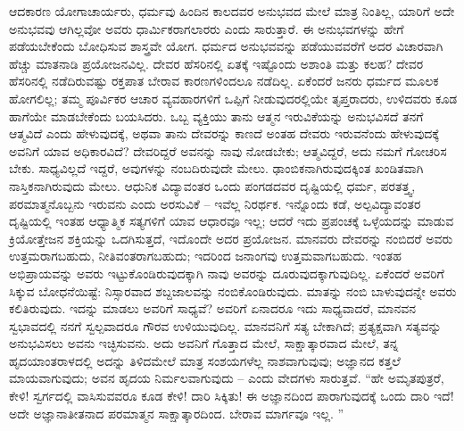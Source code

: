 ಆದಕಾರಣ ಯೋಗಾಚಾರ್ಯರು, ಧರ್ಮವು ಹಿಂದಿನ ಕಾಲದವರ ಅನುಭವದ ಮೇಲೆ ಮಾತ್ರ ನಿಂತಿಲ್ಲ, ಯಾರಿಗೆ ಅದೇ ಅನುಭವವು ಆಗಿಲ್ಲವೋ ಅವರು ಧಾರ್ಮಿಕರಾಗಲಾರರು ಎಂದು ಸಾರುತ್ತಾರೆ. ಈ ಅನುಭವಗಳನ್ನು ಹೇಗೆ ಪಡೆಯಬೇಕೆಂದು ಬೋಧಿಸುವ ಶಾಸ್ತ್ರವೇ ಯೋಗ. ಧರ್ಮದ ಅನುಭವವನ್ನು ಪಡೆಯುವವರೆಗೆ ಅದರ ವಿಚಾರವಾಗಿ ಹೆಚ್ಚು ಮಾತನಾಡಿ ಪ್ರಯೋಜನವಿಲ್ಲ. ದೇವರ ಹೆಸರಿನಲ್ಲಿ ಏತಕ್ಕೆ ಇಷ್ಟೊಂದು ಅಶಾಂತಿ ಮತ್ತು ಕಲಹ? ದೇವರ ಹೆಸರಿನಲ್ಲಿ ನಡೆದಿರುವಷ್ಟು ರಕ್ತಪಾತ ಬೇರಾವ ಕಾರಣಗಳಿಂದಲೂ ನಡೆದಿಲ್ಲ. ಏಕೆಂದರೆ ಜನರು ಧರ್ಮದ ಮೂಲಕ ಹೋಗಲಿಲ್ಲ; ತಮ್ಮ ಪೂರ್ವಿಕರ ಆಚಾರ ವ್ಯವಹಾರಗಳಿಗೆ ಒಪ್ಪಿಗೆ ನೀಡುವುದರಲ್ಲಿಯೇ ತೃಪ್ತರಾದರು, ಉಳಿದವರು ಕೂಡ ಹಾಗೆಯೇ ಮಾಡಬೇಕೆಂದು ಬಯಸಿದರು. ಒಬ್ಬ ವ್ಯಕ್ತಿಯು ತಾನು ಆತ್ಮನ ಇರುವಿಕೆಯನ್ನು ಅನುಭವಿಸದೆ ತನಗೆ ಆತ್ಮವಿದೆ ಎಂದು ಹೇಳುವುದಕ್ಕೆ, ಅಥವಾ ತಾನು ದೇವರನ್ನು ಕಾಣದೆ ಅಂತಹ ದೇವರು ಇರುವನೆಂದು ಹೇಳುವುದಕ್ಕೆ ಅವನಿಗೆ ಯಾವ ಅಧಿಕಾರವಿದೆ? ದೇವರಿದ್ದರೆ ಅವನನ್ನು ನಾವು ನೋಡಬೇಕು; ಆತ್ಮವಿದ್ದರೆ, ಅದು ನಮಗೆ ಗೋಚರಿಸ ಬೇಕು. ಸಾಧ್ಯವಿಲ್ಲದೆ ಇದ್ದರೆ, ಅವುಗಳನ್ನು ನಂಬದಿರುವುದೇ ಮೇಲು. ಢಾಂಬಿಕನಾಗಿರುವುದಕ್ಕಿಂತ ಖಂಡಿತವಾಗಿ ನಾಸ್ತಿಕನಾಗಿರುವುದು ಮೇಲು. ಆಧುನಿಕ ವಿದ್ಯಾವಂತರ ಒಂದು ಪಂಗಡದವರ ದೃಷ್ಟಿಯಲ್ಲಿ ಧರ್ಮ, ಪರತತ್ತ್ವ, ಪರಮಾತ್ಮನೊಬ್ಬನು ಇರುವನು ಎಂದು ಅರಸುವಿಕೆ – ಇವೆಲ್ಲ ನಿರರ್ಥಕ. ಇನ್ನೊಂದು ಕಡೆ, ಅಲ್ಪವಿದ್ಯಾವಂತರ ದೃಷ್ಟಿಯಲ್ಲಿ ಇಂತಹ ಆಧ್ಯಾತ್ಮಿಕ ಸತ್ಯಗಳಿಗೆ ಯಾವ ಆಧಾರವೂ ಇಲ್ಲ; ಆದರೆ ಇದು ಪ್ರಪಂಚಕ್ಕೆ ಒಳ್ಳೆಯದನ್ನು ಮಾಡುವ ಕ್ರಿಯೋತ್ತೇಜನ ಶಕ್ತಿಯನ್ನು ಒದಗಿಸುತ್ತದೆ, ಇದೊಂದೇ ಅದರ ಪ್ರಯೋಜನ. ಮಾನವರು ದೇವರನ್ನು ನಂಬಿದರೆ ಅವರು ಉತ್ತಮರಾಗಬಹುದು, ನೀತಿವಂತರಾಗಬಹುದು; ಇದರಿಂದ ಜನಾಂಗವು ಉತ್ತಮವಾಗಬಹುದು. ಇಂತಹ ಅಭಿಪ್ರಾಯವನ್ನು ಅವರು ಇಟ್ಟುಕೊಂಡಿರುವುದಕ್ಕಾಗಿ ನಾವು ಅವರನ್ನು ದೂರುವುದಕ್ಕಾಗುವುದಿಲ್ಲ. ಏಕೆಂದರೆ ಅವರಿಗೆ ಸಿಕ್ಕುವ ಬೋಧನೆಯಿಷ್ಟೆ: ನಿಸ್ಸಾರವಾದ ಶಬ್ದಜಾಲವನ್ನು ನಂಬಿಕೊಂಡಿರುವುದು. ಮಾತನ್ನು ನಂಬಿ ಬಾಳುವುದನ್ನೇ ಅವರು ಕಲಿತಿರುವುದು. ಇದನ್ನು ಮಾಡಲು ಅವರಿಗೆ ಸಾಧ್ಯವೆ? ಅವರಿಗೆ ಏನಾದರೂ ಇದು ಸಾಧ್ಯವಾದರೆ, ಮಾನವನ ಸ್ವಭಾವದಲ್ಲಿ ನನಗೆ ಸ್ವಲ್ಪವಾದರೂ ಗೌರವ ಉಳಿಯುವುದಿಲ್ಲ. ಮಾನವನಿಗೆ ಸತ್ಯ ಬೇಕಾಗಿದೆ; ಪ್ರತ್ಯಕ್ಷವಾಗಿ ಸತ್ಯವನ್ನು ಅನುಭವಿಸಲು ಅವನು ಇಚ್ಛಿಸುವನು. ಅದು ಅವನಿಗೆ ಗೊತ್ತಾದ ಮೇಲೆ, ಸಾಕ್ಷಾತ್ಕಾರವಾದ ಮೇಲೆ, ತನ್ನ ಹೃದಯಾಂತರಾಳದಲ್ಲಿ ಅದನ್ನು ತಿಳಿದಮೇಲೆ ಮಾತ್ರ ಸಂಶಯಗಳೆಲ್ಲ ನಾಶವಾಗುವುವು; ಅಜ್ಞಾನದ ಕತ್ತಲೆ ಮಾಯವಾಗುವುದು; ಅವನ ಹೃದಯ ನಿರ್ಮಲವಾಗುವುದು – ಎಂದು ವೇದಗಳು ಸಾರುತ್ತವೆ. “ಹೇ ಅಮೃತಪುತ್ರರೆ, ಕೇಳಿ! ಸ್ವರ್ಗದಲ್ಲಿ ವಾಸಿಸುವವರೂ ಕೂಡ ಕೇಳಿ! ದಾರಿ ಸಿಕ್ಕಿತು! ಈ ಅಜ್ಞಾನದಿಂದ ಪಾರಾಗುವುದಕ್ಕೆ ಒಂದು ದಾರಿ ಇದೆ! ಅದೇ ಅಜ್ಞಾನಾತೀತನಾದ ಪರಮಾತ್ಮನ ಸಾಕ್ಷಾತ್ಕಾರದಿಂದ. ಬೇರಾವ ಮಾರ್ಗವೂ ಇಲ್ಲ. ”

\vskip 5pt

